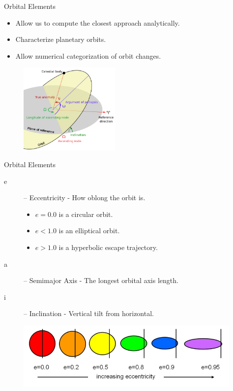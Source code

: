 \documentclass{beamer}
\begin{document}
\begin{frame}{Orbital Elements}
    \begin{itemize}
        \item Allow us to compute the closest approach analytically.
        \item Characterize planetary orbits.
        \item Allow numerical categorization of orbit changes.
    \end{itemize}
    \begin{figure}
        \centering
        \includegraphics[height=1.75in]{orbital_elems}
    \end{figure}

\end{frame}

\begin{frame}{Orbital Elements}
    \begin{description}
        \item[e] -- Eccentricity - How oblong the orbit is.
            \begin{itemize}
                \item $e = 0.0$ is a circular orbit.
                \item $e < 1.0$ is an elliptical orbit.
                \item $e > 1.0$ is a hyperbolic escape trajectory.
            \end{itemize}
        \item[a] -- Semimajor Axis - The longest orbital axis length.
        \item[i] -- Inclination - Vertical tilt from horizontal.
    \end{description}
    \begin{figure}
        \centering
        \includegraphics[height=1.3in]{eccentricity}
    \end{figure}
\end{frame}
\end{document}
